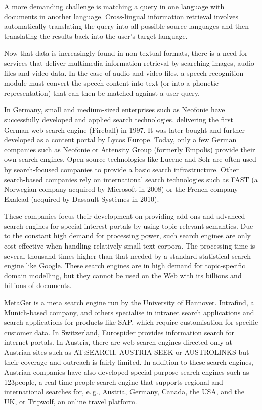 \documentclass[]{../../metanetpaper}
\begin{document}
\begin{multicols}{2}
A more demanding challenge is matching a query in one language with documents in another language. Cross-lingual information retrieval involves automatically translating the query into all possible source languages and then translating the results back into the user's target language.

Now that data is increasingly found in non-textual formats, there is a need for services that deliver multimedia information retrieval by searching images, audio files and video data. In the case of audio and video files, a speech recognition module must convert the speech content into text (or into a phonetic representation) that can then be matched against a user query.

In Germany, small and medium-sized enterprises such as Neofonie have successfully developed and applied search technologies, delivering the first German web search engine (Fireball) in 1997. It was later bought and further developed as a content portal by Lycos Europe. Today, only a few German companies such as Neofonie or Attensity Group (formerly Empolis) provide their own search engines. Open source technologies like Lucene and Solr are often used by search-focused companies to provide a basic search infrastructure. Other search-based companies rely on international search technologies such as FAST (a Norwegian company acquired by Microsoft in 2008) or the French company Exalead (acquired by Dassault Systèmes in 2010).

These companies focus their development on providing add-ons and advanced search engines for special interest portals by using topic-relevant semantics. Due to the constant high demand for processing power, such search engines are only cost-effective when handling relatively small text corpora. The processing time is several thousand times higher than that needed by a standard statistical search engine like Google. These search engines are in high demand for topic-specific domain modelling, but they cannot be used on the Web with its billions and billions of documents.

MetaGer is a meta search engine run by the University of Hannover. Intrafind, a Munich-based company, and others specialise in intranet search applications and search applications for products like SAP, which require customisation for specific customer data. In Switzerland, Eurospider provides information search for internet portals. In Austria, there are web search engines directed only at Austrian sites such as AT:SEARCH, AUSTRIA-SEEK or AUSTROLINKS but their coverage and outreach is fairly limited. In addition to these search engines, Austrian companies have also developed special purpose search engines such as 123people, a real-time people search engine that supports regional and international searches for, e.\,g., Austria, Germany, Canada, the USA, and the UK, or Tripwolf, an online travel platform.


\end{multicols}
\end{document}
